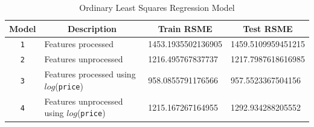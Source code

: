 \documentclass[11pt,letterpaper]{article}
\begin{document}
\begin{table}[H]
    \centering
    \begin{tabular}{clll}
        \hline
    Model & \multicolumn{1}{c}{Description} & \multicolumn{1}{c}{Train RSME} & \multicolumn{1}{c}{Test RSME} \\
    \hline
    \texttt{1}     & Features processed              & 1453.1935502136905                                                       & 1459.5109959451215                                                      \\
    \texttt{2}     & Features unprocessed            & 1216.495767837737                                                        & 1217.7987618616985                                                      \\
    \texttt{3}     & Features processed using $log$(\texttt{price})   & 958.0855791176566                                                        & 957.5523367504156                                                       \\
    \texttt{4}     & Features unprocessed using $log$(\texttt{price}) & 1215.167267164955                                                        & 1292.934288205552                                                      
    \end{tabular}
    \caption{Ordinary Least Squares Regression Model}
    \end{table}
\end{document}
